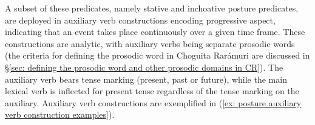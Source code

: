 A subset of these predicates, namely stative and inchoative posture predicates, are deployed in auxiliary verb constructions encoding progressive aspect, indicating that an event takes place continuously over a given time frame. These constructions are analytic, with auxiliary verbs being separate prosodic words (the criteria for defining the prosodic word in Choguita Rarámuri are discussed in §\ref{sec: defining the prosodic word and other prosodic domains in CR}). The auxiliary verb bears tense marking (present, past or future), while the main lexical verb is inflected for present tense regardless of the tense marking on the auxiliary. Auxiliary verb constructions are exemplified in (\ref{ex: posture auxiliary verb construction examples}).

\ea\label{ex: posture auxiliary verb construction examples}

